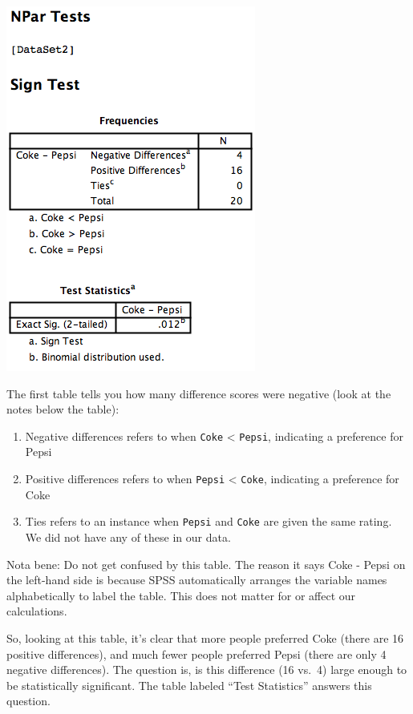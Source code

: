 \documentclass[
]{book}
\providecommand{\tightlist}{%
  \setlength{\itemsep}{0pt}\setlength{\parskip}{0pt}}
\begin{document}
\includegraphics{img/5.4.17.png}

The first table tells you how many difference scores were negative (look at the notes below the table):

\begin{enumerate}
\def\labelenumi{\alph{enumi}.}
\tightlist
\item
  Negative differences refers to when \texttt{Coke} \textless{} \texttt{Pepsi}, indicating a preference for Pepsi
\item
  Positive differences refers to when \texttt{Pepsi} \textless{} \texttt{Coke}, indicating a preference for Coke
\item
  Ties refers to an instance when \texttt{Pepsi} and \texttt{Coke} are given the same rating. We did not have any of these in our data.
\end{enumerate}

Nota bene: Do not get confused by this table. The reason it says Coke - Pepsi on the left-hand side is because SPSS automatically arranges the variable names alphabetically to label the table. This does not matter for or affect our calculations.

So, looking at this table, it's clear that more people preferred Coke (there are 16 positive differences), and much fewer people preferred Pepsi (there are only 4 negative differences). The question is, is this difference (16 vs.~4) large enough to be statistically significant. The table labeled ``Test Statistics'' answers this question.
\end{document}
